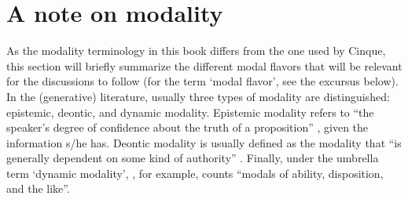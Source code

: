 \section{A note on modality}\label{anoteonmodality}%
As the modality terminology in this book differs from the one used by Cinque, this section will briefly summarize the different modal flavors that will be relevant for the discussions to follow (for the term `modal flavor', see the excursus below). In the (generative) literature, usually three types of modality are distinguished: epistemic, deontic, and dynamic modality. Epistemic modality refers to ``the speaker's degree of confidence about the truth of a proposition'' \citep[86]{cinque1999adverbs}, given the information s/he has. Deontic modality is usually defined as the modality that ``is generally dependent on some kind of authority'' \citep[70]{palmer2001mood}. Finally, under the umbrella term `dynamic modality', \citet[196]{portner2009modality}, for example, counts ``modals of ability, disposition, and the like''. 

